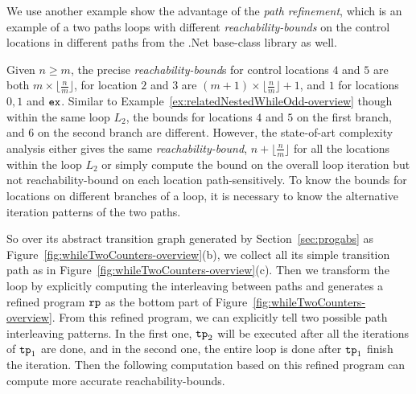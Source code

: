 \begin{example}
  \label{ex:twoCounterWhile}
  
  We use another example show the advantage of the \emph{path refinement}, which is an example of a two paths loops
  with different \emph{reachability-bounds} on the control locations in different paths from the .Net base-class library as well.

  Given $n \geq m$,
the precise \emph{reachability-bound}s for control locations $4$ and $5$ are both $m \times \lfloor\frac{n}{m}\rfloor$,
for location $2$ and $3$ are $(m + 1) \times \lfloor\frac{n}{m}\rfloor + 1$, 
and $1$ for locations $0, 1$ and $\mathtt{ex}$. 
{Similar to Example~\ref{ex:relatedNestedWhileOdd-overview} though within the same loop $L_2$, the bounds for locations $4$ and $5$ on the first branch, and $6$ on the second branch are different.}
However, the state-of-art complexity analysis either
gives the same \emph{reachability-bound}, $n + \lfloor\frac{n}{m}\rfloor$ for all the locations within the loop $L_2$
or simply compute the bound on the overall loop iteration but not reachability-bound on each location path-sensitively.
To know the bounds for locations on different branches of a loop, 
it is necessary to know the alternative iteration patterns of the two paths.

So over its abstract transition graph generated by Section~\ref{sec:progabs} as Figure~\ref{fig:whileTwoCounters-overview}(b), we collect all its simple transition path as in Figure~\ref{fig:whileTwoCounters-overview}(c).
Then we transform the loop by explicitly computing the interleaving between paths and
generates a refined program $\mathtt{rp}$ as the bottom part of Figure~\ref{fig:whileTwoCounters-overview}.
From this refined program, we can explicitly tell two possible path interleaving patterns.
In the first one, $\mathtt{tp}_2$ will be executed after all the iterations of $\mathtt{tp}_1$ are done, and in the second one,
the entire loop is done after $\mathtt{tp}_1$ finish the iteration.
Then the following computation based on this refined program can compute more accurate reachability-bounds.
\end{example}
